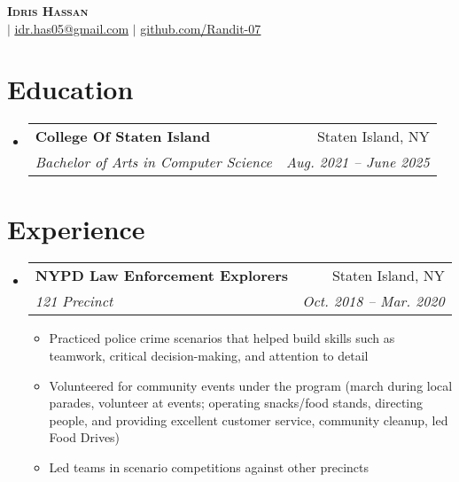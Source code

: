 \documentclass[letterpaper,11pt]{article}
\makeatletter
\newcommand{\resumeItem}[1]{
  \item\small{
    {#1 \vspace{-2pt}}
  }
}
\newcommand{\resumeSubheading}[4]{
  \vspace{-2pt}\item
    \begin{tabular*}{0.97\textwidth}[t]{l@{\extracolsep{\fill}}r}
      \textbf{#1} & #2 \\
      \textit{\small#3} & \textit{\small #4} \\
    \end{tabular*}\vspace{-7pt}
}
\newcommand{\resumeSubHeadingListStart}{\begin{itemize}[leftmargin=0.15in, label={}]}
\newcommand{\resumeSubHeadingListEnd}{\end{itemize}}
\newcommand{\resumeItemListStart}{\begin{itemize}}
\newcommand{\resumeItemListEnd}{\end{itemize}\vspace{-5pt}}
\makeatother
\begin{document}

\begin{center}
    \textbf{\Huge \scshape Idris Hassan} \\ \vspace{1pt}
     $|$ \href{mailto:idr.has05@gmail.com}{\underline{idr.has05@gmail.com}} $|$ 
        \href{https://github.com/Randit-07}{\underline{github.com/Randit-07}}
\end{center}


\section{Education}
  \resumeSubHeadingListStart
    \resumeSubheading
      {College Of Staten Island}{Staten Island, NY}
      {Bachelor of Arts in Computer Science}{Aug. 2021 -- June 2025}
  \resumeSubHeadingListEnd


\section{Experience}
  \resumeSubHeadingListStart

    \resumeSubheading
      {NYPD Law Enforcement Explorers}{Staten Island, NY}
      {121 Precinct}{Oct. 2018 -- Mar. 2020}
      \resumeItemListStart
        \resumeItem{Practiced police crime scenarios that helped build skills such as teamwork, critical decision-making, and attention to detail}
        \resumeItem{Volunteered for community events under the program (march during local parades, volunteer at events; operating snacks/food stands, directing people, and providing excellent customer service, community cleanup, led Food Drives)}
        \resumeItem{Led teams in scenario competitions against other precincts}
      \resumeItemListEnd
      
  \resumeSubHeadingListEnd


\end{document}
